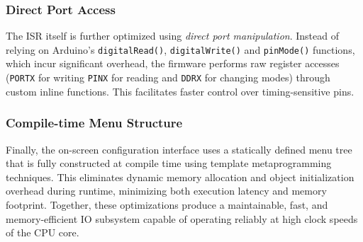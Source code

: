 \subsubsection{Direct Port Access} The ISR itself is further optimized using \emph{direct port manipulation}. Instead of relying on Arduino’s \texttt{digitalRead()}, \texttt{digitalWrite()} and \texttt{pinMode()} functions, which incur significant overhead, the firmware performs raw register accesses (\texttt{PORTX} for writing \texttt{PINX} for reading and \texttt{DDRX} for changing modes) through custom inline functions. This facilitates faster control over timing-sensitive pins.

\subsubsection{Compile-time Menu Structure} Finally, the on-screen configuration interface uses a statically defined menu tree that is fully constructed at compile time using template metaprogramming techniques. This eliminates dynamic memory allocation and object initialization overhead during runtime, minimizing both execution latency and memory footprint. Together, these optimizations produce a maintainable, fast, and memory-efficient IO subsystem capable of operating reliably at high clock speeds of the CPU core.
\vfill

